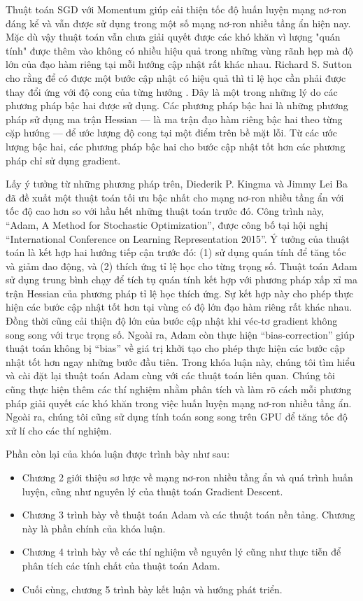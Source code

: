 Thuật toán SGD với Momentum giúp cải thiện tốc độ huấn luyện mạng nơ-ron đáng kể và vẫn được sử dụng trong một số mạng nơ-ron nhiều tầng ẩn hiện nay. Mặc dù vậy thuật toán vẫn chưa giải quyết được các khó khăn vì lượng "quán tính" được thêm vào không có nhiều hiệu quả trong những vùng rãnh hẹp mà độ lớn của đạo hàm riêng tại mỗi hướng cập nhật rất khác nhau. Richard S. Sutton cho rằng để có được một bước cập nhật có hiệu quả thì tỉ lệ học cần phải được thay đổi ứng với độ cong của từng hướng \cite{sutton1986two}. Đây là một trong những lý do các phương pháp bậc hai được sử dụng. Các phương pháp bậc hai là những phương pháp sử dụng ma trận Hessian — là ma trận đạo hàm riêng bậc hai theo từng cặp hướng — để ước lượng độ cong tại một điểm trên bề mặt lỗi. Từ các ước lượng bậc hai, các phương pháp bậc hai cho bước cập nhật tốt hơn các phương pháp chỉ sử dụng gradient.

Lấy ý tưởng từ những phương pháp trên, Diederik P. Kingma và Jimmy Lei Ba đã đề xuất một thuật toán tối ưu bậc nhất cho mạng nơ-ron nhiều tầng ẩn với tốc độ cao hơn so với hầu hết những thuật toán trước đó\cite{kingma2014adam}. Công trình này, ``Adam, A Method for Stochastic Optimization'', được công bố tại hội nghị ``International Conference on Learning Representation 2015''. Ý tưởng của thuật toán là kết hợp hai hướng tiếp cận trước đó: (1) sử dụng quán tính để tăng tốc và giảm dao động, và (2) thích ứng tỉ lệ học cho từng trọng số. Thuật toán Adam sử dụng trung bình chạy để tích tụ quán tính kết hợp với phương pháp xấp xỉ ma trận Hessian của phương pháp tỉ lệ học thích ứng. Sự kết hợp này cho phép thực hiện các bước cập nhật tốt hơn tại vùng có độ lớn đạo hàm riêng rất khác nhau. Đồng thời cũng cải thiện độ lớn của bước cập nhật khi véc-tơ gradient không song song với trục trọng số. Ngoài ra, Adam còn thực hiện ``bias-correction'' giúp thuật toán không bị ``bias'' về giá trị khởi tạo cho phép thực hiện các bước cập nhật tốt hơn ngay những bước đầu tiên. Trong khóa luận này, chúng tôi tìm hiểu và cài đặt lại thuật toán Adam cùng với các thuật toán liên quan. Chúng tôi cũng thực hiện thêm các thí nghiệm nhằm phân tích và làm rõ cách mỗi phương pháp giải quyết các khó khăn trong việc huấn luyện mạng nơ-ron nhiều tầng ẩn. Ngoài ra, chúng tôi cũng sử dụng tính toán song song trên GPU để tăng tốc độ xử lí cho các thí nghiệm.

Phần còn lại của khóa luận được trình bày như sau:

\begin{itemize}
	\item Chương 2 giới thiệu sơ lược về mạng nơ-ron nhiều tầng ẩn và quá trình huấn luyện, cũng như nguyên lý của thuật toán Gradient Descent.
	\item Chương 3 trình bày về thuật toán Adam và các thuật toán nền tảng. Chương này là phần chính của khóa luận.
	\item Chương 4 trình bày về các thí nghiệm về nguyên lý cũng như thực tiễn để phân tích các tính chất của thuật toán Adam.
	\item Cuối cùng, chương 5 trình bày kết luận và hướng phát triển.
\end{itemize}
